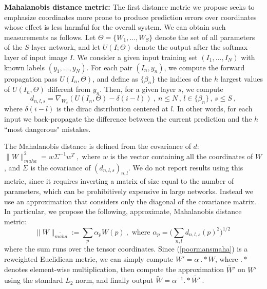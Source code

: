 {\bf Mahalanobis distance metric: }
The first distance metric we propose seeks to emphasize coordinates more prone to produce prediction errors over 
coordinates whose effect is less harmful for the overall system. 
We can obtain such measurements as follows.
Let $\Theta=\{W_1,\dots,W_S\}$ denote
the set of all parameters of the $S$-layer network, and let $U(I; \Theta)$ denote the output 
after the softmax layer of input image $I$.
We consider  a given input training set $(I_1,\dots,I_N)$ 
with known labels $(y_1,\dots,y_N)$. For each pair $(I_n, y_n)$, 
we compute the forward propagation pass $U(I_n, \Theta)$, and 
define as $\{\beta_n\}$ the indices of the $h$ largest values of  $U(I_n, \Theta)$ 
different from $y_n$.
Then, for a given layer $s$, we compute
\begin{equation}
\label{approxi}
d_{n,l,s} = \nabla_{W_s} \left( U(I_n, \Theta) - \delta(i - l)\right)~,~n\leq N\,,\, l \in \{\beta_n\}\,,\, s\leq S~,
\end{equation}
where $\delta(i-l)$ is the dirac distribution centered at $l$.
In other words, for each input we back-propagate the difference between the current prediction and the 
$h$ ``most dangerous" mistakes. 

The Mahalanobis distance is defined from the covariance of 
$d$: $\| W \|_{maha}^2 = w \Sigma^{-1} w^T~,$
where $w$ is the vector containing all the coordinates of $W$, and $\Sigma$ is the covariance of $(d_{n,l,s})_{n,l}$. 
We do not report results using this metric, since it requires inverting a matrix of size equal to the number 
of parameters, which can be prohibitively expensive in large networks.
Instead we use an approximation that considers only the diagonal of the covariance matrix. 
In particular, we propose the following, approximate, Mahalanobis distance metric: 
\begin{equation}
\label{poormansmaha}
\| W \|_{\widetilde{maha}} := \sum_p \alpha_p W(p) ~,\text{ where } \alpha_p = \Big( \sum_{n,l} d_{n,l,s}(p)^2 \Big)^{1/2}~
\end{equation}
where the sum runs over the tensor coordinates.
Since (\ref{poormansmaha}) is a reweighted Euclidiean metric, we 
can simply compute $W' = \alpha~ .* W$, where $.*$ denotes element-wise multiplication, 
then compute the approximation $\tilde{W'}$ on $W'$ using the standard $L_2$ norm, 
and finally output $\tilde{W} = \alpha^{-1} .* \tilde{W'}~.$

